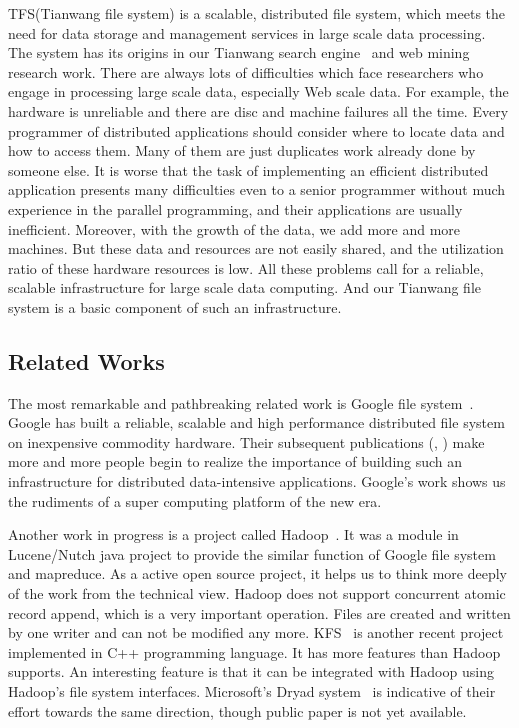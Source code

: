 \documentclass[letterpaper,twocolumn,10pt]{article}
\begin{document}
TFS(Tianwang file system) is a scalable, distributed file system, which meets the need for data storage and management services in large scale data processing. The system has its origins in our Tianwang search engine~\cite{Tianwang} and web mining research work. There are always lots of difficulties which face researchers who engage in processing large scale data, especially Web scale data. For example, the hardware is unreliable and there are disc and machine failures all the time. Every programmer of distributed applications should consider where to locate data and how to access them. Many of them are just duplicates work already done by someone else. It is worse that the task of implementing an efficient distributed application presents many difficulties even to a senior programmer without much experience in the parallel programming, and their applications are usually inefficient. Moreover, with the growth of the data, we add more and more machines. But these data and resources are not easily shared, and the utilization ratio of these hardware resources is low. All these problems call for a reliable, scalable infrastructure for large scale data computing. And our Tianwang file system is a basic component of such an infrastructure. 
\subsection{Related Works}
The most remarkable and pathbreaking related work is Google file system~\cite{gfs2003}. Google has built a reliable, scalable and high performance distributed file system on inexpensive commodity hardware. Their subsequent publications (\cite{mapreduce}, \cite{bigtable}) make more and more people begin to realize the importance of building such an infrastructure for distributed data-intensive applications. Google's work shows us the rudiments of a super computing platform of the new era.

Another work in progress is a project called Hadoop~\cite{hadoop}. It was a module in Lucene/Nutch java project to provide the similar function of Google file system and mapreduce. As a active open source project, it helps us to think more deeply of the work from the technical view. Hadoop does not support concurrent atomic record append, which is a very important operation. Files are created and written by one writer and can not be modified any more. KFS~\cite{kfs} is another recent project implemented in C++ programming language. It has more features than Hadoop supports. An interesting feature is that it can be integrated with Hadoop using Hadoop's file system interfaces. Microsoft's Dryad system~\cite{Dryad2007} is indicative of their effort towards the same direction, though public paper is not yet available.
\end{document}
